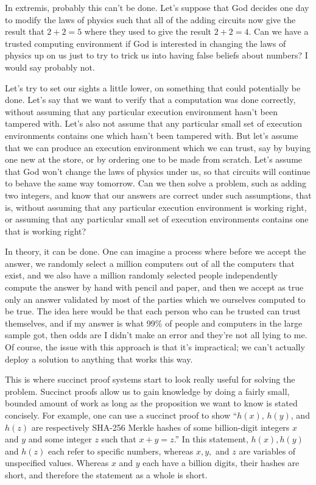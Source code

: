 \documentclass[11pt]{article}
\begin{document}
In extremis, probably this can't be done. Let's suppose that God decides one day
to modify the laws of physics such that all of the adding circuits now give
the result that $2+2=5$ where they used to give the result $2+2=4$. Can we have
a trusted computing environment if God is interested in changing the laws of physics
up on us just to try to trick us into having false beliefs about numbers? I would say
probably not.

Let's try to set our sights a little lower, on something that could potentially be done.
Let's say that we want to verify that a computation was done correctly, without
assuming that any particular execution environment hasn't been tampered with. Let's also
not assume that any particular small set of execution environments contains one which
hasn't been tampered with. But let's assume that we can produce an execution environment
which we can trust, say by buying one new at the store, or by ordering one to be made
from scratch. Let's assume that God won't change the laws of physics under us, so that
circuits will continue to behave the same way tomorrow. Can we then solve a problem,
such as adding two integers, and know that our answers are correct under such assumptions,
that is, without assuming that any particular execution environment is working right,
or assuming that any particular small set of execution environments contains one that is
working right?

In theory, it can be done. One can imagine a process where before we accept the answer,
we randomly select a million computers out of all the computers that exist, and we
also have a million randomly selected people independently compute the answer by hand with pencil and
paper, and then we accept as true only an answer validated by most of the parties
which we ourselves computed to be true. The idea here would be that each person who
can be trusted can trust themselves, and if my answer is what 99\% of people and computers
in the large sample got, then odds are I didn't make an error and they're not all lying to me. Of course,
the issue with this approach is that it's impractical; we can't actually deploy a solution
to anything that works this way.

This is where succinct proof systems start to look really useful for solving the problem.
Succinct proofs allow us to gain knowledge by doing a fairly small, bounded amount of work
as long as the proposition we want to know is stated concisely.
For example, one can use a succinct proof to show ``$h(x)$, $h(y)$, and $h(z)$ are
respectively SHA-256 Merkle hashes of some billion-digit integers $x$ and $y$ and some
integer $z$ such that $x + y = z$.'' In this statement, $h(x), h(y)$ and $h(z)$ each
refer to specific numbers, whereas $x, y,$ and $z$ are variables of unspecified values.
Whereas $x$ and $y$ each have a billion digits, their hashes are short, and therefore
the statement as a whole is short.
\end{document}
